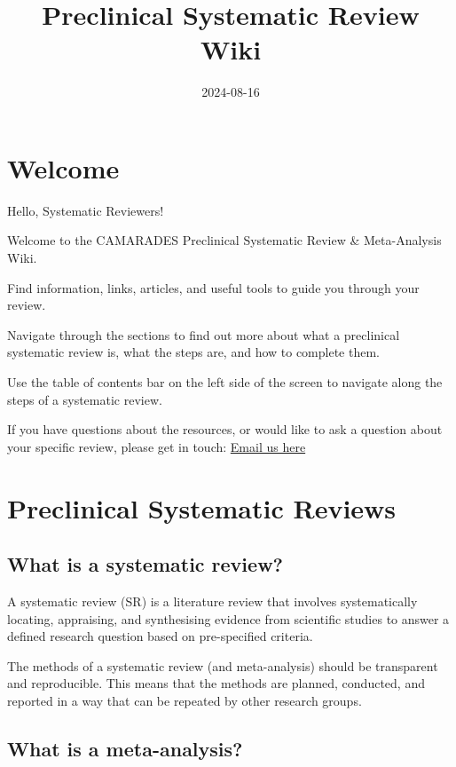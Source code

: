 \documentclass[
]{book}
\title{Preclinical Systematic Review Wiki}
\author{}
\date{\vspace{-2.5em}2024-08-16}
\begin{document}
\maketitle

{
\setcounter{tocdepth}{1}
\tableofcontents
}
\chapter{Welcome}\label{welcome}

Hello, Systematic Reviewers!

Welcome to the CAMARADES Preclinical Systematic Review \& Meta-Analysis Wiki.

Find information, links, articles, and useful tools to guide you through your review.

Navigate through the sections to find out more about what a preclinical systematic review is, what the steps are, and how to complete them.

Use the table of contents bar on the left side of the screen to navigate along the steps of a systematic review.

If you have questions about the resources, or would like to ask a question about your specific review, please get in touch:
\href{mailto:CAMARADES.berlin@charite.de}{Email us here}

\chapter{Preclinical Systematic Reviews}\label{intro}

\section{What is a systematic review?}\label{what-is-a-systematic-review}

A systematic review (SR) is a literature review that involves systematically locating, appraising, and synthesising evidence from scientific studies to answer a defined research question based on pre-specified criteria.

The methods of a systematic review (and meta-analysis) should be transparent and reproducible. This means that the methods are planned, conducted, and reported in a way that can be repeated by other research groups.

\section{What is a meta-analysis?}\label{what-is-a-meta-analysis}
\end{document}
